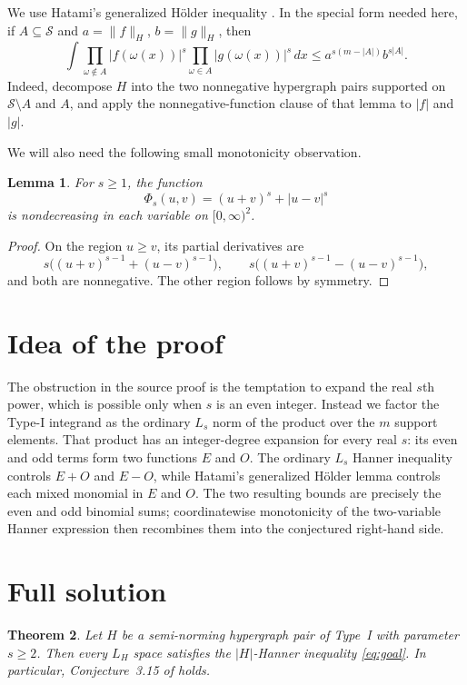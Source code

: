 \documentclass[11pt]{article}
\newtheorem{theorem}{Theorem}
\newtheorem{lemma}[theorem]{Lemma}
\newcommand{\cS}{\mathcal S}
\begin{document}
We use Hatami's generalized H\"older inequality \cite[Lemma~2.10]{Hatami}.
In the special form needed here, if $A\subseteq\cS$ and
$a=\|f\|_H$, $b=\|g\|_H$, then
\begin{equation}\label{eq:mixed-holder}
 \int \prod_{\omega\notin A}|f(\omega(x))|^s
       \prod_{\omega\in A}|g(\omega(x))|^s\,dx
 \le a^{s(m-|A|)}b^{s|A|}.
\end{equation}
Indeed, decompose $H$ into the two nonnegative hypergraph pairs supported on
$\cS\setminus A$ and $A$, and apply the nonnegative-function clause of that
lemma to $|f|$ and $|g|$.

We will also need the following small monotonicity observation.

\begin{lemma}\label{lem:monotone}
For $s\ge1$, the function
\[
 \Phi_s(u,v)=(u+v)^s+|u-v|^s
\]
is nondecreasing in each variable on $[0,\infty)^2$.
\end{lemma}

\begin{proof}
On the region $u\ge v$, its partial derivatives are
\[
 s\big((u+v)^{s-1}+(u-v)^{s-1}\big),\qquad
 s\big((u+v)^{s-1}-(u-v)^{s-1}\big),
\]
and both are nonnegative.  The other region follows by symmetry.
\end{proof}

\section{Idea of the proof}

The obstruction in the source proof is the temptation to expand the real
$s$th power, which is possible only when $s$ is an even integer.  Instead we
factor the Type-I integrand as the ordinary $L_s$ norm of the product over the
$m$ support elements.  That product has an integer-degree expansion for every
real $s$: its even and odd terms form two functions $E$ and $O$.  The ordinary
$L_s$ Hanner inequality controls $E+O$ and $E-O$, while Hatami's generalized
H\"older lemma controls each mixed monomial in $E$ and $O$.  The two resulting
bounds are precisely the even and odd binomial sums; coordinatewise
monotonicity of the two-variable Hanner expression then recombines them into
the conjectured right-hand side.

\section{Full solution}

\begin{theorem}\label{thm:main}
Let $H$ be a semi-norming hypergraph pair of Type~I with parameter $s\ge2$.
Then every $L_H$ space satisfies the $|H|$-Hanner inequality
\eqref{eq:goal}.  In particular, Conjecture~3.15 of \cite{Hatami} holds.
\end{theorem}
\end{document}
